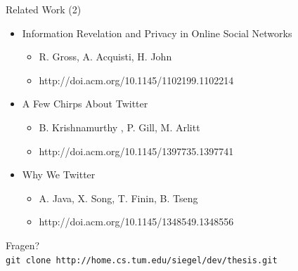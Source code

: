 \documentclass[11pt]{beamer}
\begin{document}
\begin{frame}{Related Work (2)}
  \begin{itemize}
    \item Information Revelation and Privacy in Online Social Networks
    \begin{itemize}
      \item R. Gross, A. Acquisti, H.  John
      \item http://doi.acm.org/10.1145/1102199.1102214
    \end{itemize}
    \item A Few Chirps About Twitter
    \begin{itemize}
      \item B. Krishnamurthy , P. Gill, M. Arlitt
      \item http://doi.acm.org/10.1145/1397735.1397741
    \end{itemize}
    \item Why We Twitter
    \begin{itemize}
      \item A. Java, X. Song, T. Finin, B. Tseng
      \item http://doi.acm.org/10.1145/1348549.1348556
    \end{itemize}
  \end{itemize}
\end{frame}

\begin{frame}
  \begin{center}
  {\Huge Fragen?}\\

\vfill
  \texttt{git clone http://home.cs.tum.edu/siegel/dev/thesis.git}
  \end{center}
\end{frame}
\end{document}
